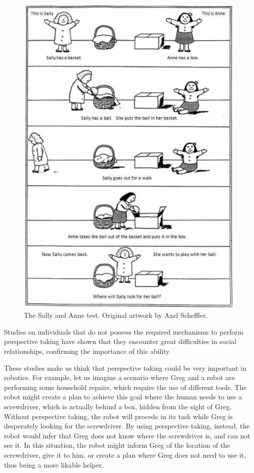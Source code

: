  \begin{figure}[ht!]
	\centering
	\includegraphics[scale=0.45]{img/observer/sally-anne.jpg}
	\caption{The Sally and Anne test. Original artwork by Axel Scheffler.}
	\label{fig:belief_management-sally_anne}
\end{figure}

Studies on individuals that do not possess the required mechanisms to perform perspective taking \citep{frick2014picturing} have shown that they encounter great difficulties in social relationships, confirming the importance of this ability.

These studies make us think that perspective taking could be very important in robotics. For example, let us imagine a scenario where Greg and a robot are performing some household repairs, which require the use of different tools. The robot might create a plan to achieve this goal where the human needs to use a screwdriver, which is actually behind a box, hidden from the sight of  Greg. Without perspective taking, the robot will procede in its task while Greg is desperately looking for the screwdriver. By using perspective taking, instead, the robot would infer that Greg does not know where the screwdriver is, and can not see it. In this situation, the robot might inform Greg of the location of the screwdriver, give it to him, or create a plan where Greg does not need to use it, thus being a more likable helper.

